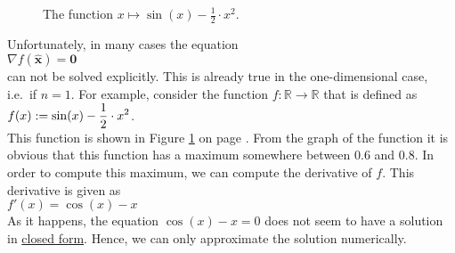 \begin{figure}[!th]
\centering
{}
\vspace*{-0.3cm}
\caption{The function $x \mapsto \sin(x) - \frac{1}{2} \cdot x^2$.}
\label{fig:sin-minus-square.eps}
\end{figure}

\noindent
Unfortunately, in many cases the equation 
\\[0.2cm]
\hspace*{1.3cm}
$\nabla f(\mathbf{\widehat{x}}) = \mathbf{0}$
\\[0.2cm]
can not be solved explicitly.  This is already true in the one-dimensional case, i.e.~if $n=1$.  For example, consider
the function $f:\mathbb{R} \rightarrow \mathbb{R}$ that is defined as
\\[0.2cm]
\hspace*{1.3cm}
$\displaystyle f(x) := \sin(x) - \frac{1}{2} \cdot x^2$.
\\[0.2cm]
This function is shown in Figure \ref{fig:sin-minus-square.eps} on page \pageref{fig:sin-minus-square.eps}.
From the graph of the function it is obvious that this function has a maximum somewhere between $0.6$ and
$0.8$.  In order to compute this maximum, we can compute the derivative of $f$.   This derivative is given as 
\\[0.2cm]
\hspace*{1.3cm}
$f'(x) = \cos(x) - x$
\\[0.2cm]
As it happens, the equation $\cos(x) - x = 0$ does not seem to have a solution in 
\href{https://en.wikipedia.org/wiki/Closed-form_expression}{closed form}.  Hence, we can only approximate
the solution numerically.


